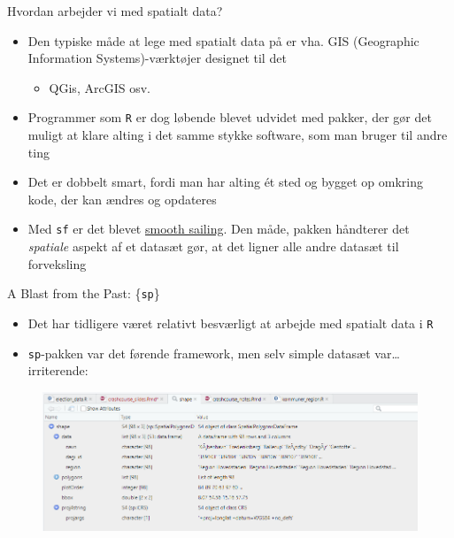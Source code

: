 \documentclass[
  8pt,
  ignorenonframetext,
  aspectratio=169]{beamer}
\providecommand{\tightlist}{%
  \setlength{\itemsep}{0pt}\setlength{\parskip}{0pt}}
\begin{document}
\begin{frame}[fragile]{Hvordan arbejder vi med spatialt data?}
\protect\hypertarget{hvordan-arbejder-vi-med-spatialt-data}{}
\begin{itemize}
\item
  Den typiske måde at lege med spatialt data på er vha. GIS (Geographic
  Information Systems)-værktøjer designet til det

  \begin{itemize}
  \tightlist
  \item
    QGis, ArcGIS osv.
  \end{itemize}
\item
  Programmer som \texttt{R} er dog løbende blevet udvidet med pakker,
  der gør det muligt at klare alting i det samme stykke software, som
  man bruger til andre ting
\item
  Det er dobbelt smart, fordi man har alting ét sted og bygget op
  omkring kode, der kan ændres og opdateres
\item
  Med \texttt{sf} er det blevet
  \href{https://www.nickbearman.me.uk/2019/04/spatial-r-moving-from-sp-to-sf/}{smooth
  sailing}. Den måde, pakken håndterer det \emph{spatiale} aspekt af et
  datasæt gør, at det ligner alle andre datasæt til forveksling
\end{itemize}
\end{frame}

\begin{frame}[fragile]{A Blast from the Past: \{\texttt{sp}\}}
\protect\hypertarget{a-blast-from-the-past-sp}{}
\tiny

\normalsize

\begin{itemize}
\item
  Det har tidligere været relativt besværligt at arbejde med spatialt
  data i \texttt{R}
\item
  \texttt{sp}-pakken var det førende framework, men selv simple datasæt
  var\ldots{} irriterende:
\end{itemize}

\begin{figure}[H]
    \centering
    \includegraphics[width=.90\textwidth]{pictures/sp.png}
\end{figure}
\end{frame}
\end{document}
